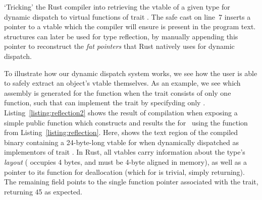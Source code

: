 

\begin{listing}[ht]
	\centering
	\inputminted{rust}{reflection.rs}
	\caption[Tricking Rust into exposing a vtable.]{`Tricking' the Rust compiler into retrieving the vtable of a given type  for dynamic dispatch to virtual functions of trait . The safe cast on line~7 inserts a pointer to a vtable which the compiler will ensure is present in the program text.  structures can later be used for type reflection, by manually appending this pointer to reconstruct the \textit{fat pointers} that Rust natively uses for dynamic dispatch.}
	\label{listing:reflection}
\end{listing}

To illustrate how our dynamic dispatch system works, we see how the user is able to safely extract an object's vtable themselves. As an example, we see which assembly is generated for the  function when the trait  consists of only one function, such that  can implement the trait by specifyding only . Listing~\ref{listing:reflection2} shows the result of compilation when exposing a simple public function which constructs and results the  for~ using the function from Listing~\ref{listing:reflection}. Here,  shows the text region of the compiled binary containing a 24-byte-long vtable for  when dynamically dispatched as implementors of trait . In Rust, all vtables carry information about the type's \textit{layout} ( occupies 4 bytes, and must be 4-byte aligned in memory), as well as a pointer to its  function for deallocation (which for  is trivial, simply returning). The remaining field points to the single function pointer associated with the trait, returning 45 as expected.  

